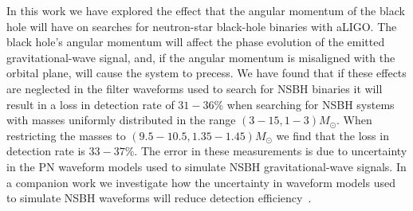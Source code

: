 In this work we have explored the effect that the angular momentum of the black
hole will have on searches for neutron-star black-hole binaries with
\ac{aLIGO}. The black hole's angular momentum will affect the phase evolution
of the emitted gravitational-wave signal, and, if the angular momentum is
misaligned with the orbital plane, will cause the system to precess. We have
found that if these effects are neglected in the filter waveforms used to
search for \ac{NSBH} binaries it will result in a loss in detection rate of
$31-36\%$ when searching for \ac{NSBH} systems with masses uniformly 
distributed in the range 
$(3-15,1-3)M_{\odot}$. When restricting the masses to 
$(9.5-10.5,1.35-1.45)M_{\odot}$ we find that the loss in detection rate is
$33 - 37\%$. The error in these measurements is due to uncertainty in 
the \ac{PN} waveform models used to simulate \ac{NSBH} gravitational-wave 
signals.  In a companion work we investigate how the uncertainty in waveform 
models used to simulate \ac{NSBH} waveforms will reduce detection 
efficiency~\cite{Nitz:2013mxa}. 

